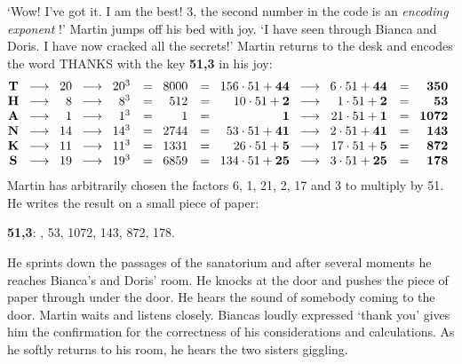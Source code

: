 `Wow! I've got it. I am the best! 
3, the second number in the code is an {\em encoding exponent \/}!'
Martin jumps off his bed with joy. 
`I have seen through Bianca and Doris. I have now cracked all the secrets!' 
Martin returns to the desk and encodes the word THANKS with the key {\bf 51,3} in his joy: 
\[
\!\!\!
\begin{array}{ccrcrcrcrcrcr}
{\bf T} & \! \longrightarrow \! & 20 & \! \longrightarrow \! & 20^3 & = \! & 8000 & = \! & 156\cdot 51 + {\bf 44} & \! \longrightarrow \! & 6\cdot 51 + {\bf 44} & = \! & {\bf 350} \\
{\bf H} & \! \longrightarrow \! & 8 & \! \longrightarrow \! & 8^3 & = \! & 512 & = \! & 10\cdot 51 + {\bf 2} & \! \longrightarrow \! & 1\cdot 51 + {\bf 2} & = \! & {\bf 53} \\
{\bf A} & \! \longrightarrow \! & 1 & \! \longrightarrow \! & 1^3 & = \! & 1 & = \! &  {\bf 1} &
\! \longrightarrow \! & 21\cdot 51 + {\bf 1} & = \! & {\bf 1072} \\
{\bf N} & \! \longrightarrow \! & 14 & \! \longrightarrow \! & 14^3 & = \! & 2744 & = \! &
53\cdot 51 + {\bf 41} & \! \longrightarrow \! & 2\cdot 51 + {\bf 41} & = \! & {\bf 143}
\\
{\bf K} & \! \longrightarrow \! & 11 & \! \longrightarrow \! & 11^3 & = \! & 1331 & = \! &
26\cdot 51 + {\bf 5} & \! \longrightarrow \! & 17\cdot 51 + {\bf 5} & = \! & {\bf 872}
\\
{\bf S} & \! \longrightarrow \! & 19 & \! \longrightarrow \! & 19^3 & = \! & 6859 & = \! & 134\cdot 51 + {\bf 25} & \! \longrightarrow \! & 3\cdot 51 + {\bf 25} & = \! & {\bf 178}
\end{array} \]
Martin has arbitrarily chosen the factors 6, 1, 21, 2, 17 and 3 to multiply by 51. 
He writes the result on a small piece of paper: 
\begin{center} 
{\bf 51,3}: , 53, 1072, 143, 872, 178. 
\end{center} 
He sprints down the passages of the sanatorium and after several moments he reaches Bianca's and Doris' room. 
He knocks at the door and pushes the piece of paper through under the door. 
He hears the sound of somebody coming to the door. 
Martin waits and listens closely.
Biancas loudly expressed `thank you' gives him the confirmation for the correctness of his considerations 
and calculations. 
As he softly returns to his room, he hears the two sisters giggling.


